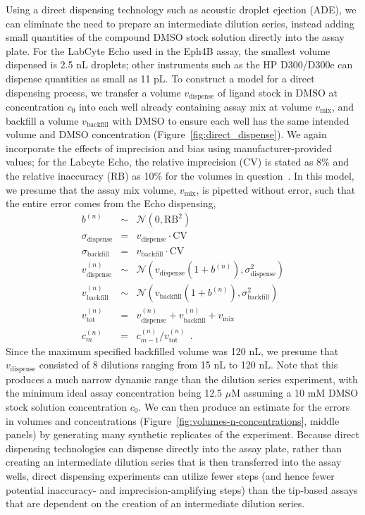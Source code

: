 \documentclass[aps,pre,twocolumn,nofootinbib,superscriptaddress,linenumbers]{revtex4-1}
\begin{document}
Using a direct dispensing technology such as acoustic droplet ejection (ADE), we can eliminate the need to prepare an intermediate dilution series, instead adding small quantities of the compound DMSO stock solution directly into the assay plate.
For the LabCyte Echo used in the Eph4B assay, the smallest volume dispensed is 2.5 nL droplets; other instruments such as the HP D300/D300e can dispense quantities as small as 11 pL.
To construct a model for a direct dispensing process, we transfer a volume $v_\mathrm{dispense}$ of ligand stock in DMSO at concentration $c_0$ into each well already containing assay mix at volume $v_\mathrm{mix}$, and backfill a volume $v_\mathrm{backfill}$ with DMSO to ensure each well has the same intended volume and DMSO concentration (Figure~\ref{fig:direct_dispense}). 
We again incorporate the effects of imprecision and bias using manufacturer-provided values;
for the Labcyte Echo, the relative imprecision (CV) is stated as 8\% and the relative inaccuracy (RB) as 10\% for the volumes in question~\cite{_echo_2011}.
In this model, we presume that the assay mix volume, $v_\mathrm{mix}$, is pipetted without error, such that the entire error comes from the Echo dispensing,
\begin{eqnarray}
b^{(n)} &\sim& \mathcal{N}(0, \mathrm{RB}^2) \nonumber \\
\sigma_\mathrm{dispense} &=& v_\mathrm{dispense} \cdot \mathrm{CV} \nonumber \\
\sigma_\mathrm{backfill} &=& v_\mathrm{backfill} \cdot \mathrm{CV} \nonumber \\
v_\mathrm{dispense}^{(n)} &\sim& \mathcal{N}(v_\mathrm{dispense} (1 + b^{(n)}) , \sigma_\mathrm{dispense}^2) \nonumber \\
v_\mathrm{backfill}^{(n)} &\sim& \mathcal{N}(v_\mathrm{backfill} (1 + b^{(n)}), \sigma_\mathrm{backfill}^2) \nonumber \\
v_\mathrm{tot}^{(n)} &=& v_\mathrm{dispense}^{(n)} + v_\mathrm{backfill}^{(n)} + v_\mathrm{mix} \nonumber \\
c_m^{(n)} &=& c_{m-1}^{(n)} / v_\mathrm{tot}^{(n)} \:\: . \label{equation:stock-concentration-uncertainty-simple}
\end{eqnarray}
Since the maximum specified backfilled volume was 120 nL, we presume that $v_\mathrm{dispense}$ consisted of 8 dilutions ranging from 15 nL to 120 nL. 
Note that this produces a much narrow dynamic range than the dilution series experiment, with the minimum ideal assay concentration being 12.5 $\mu$M assuming a 10 mM DMSO stock solution concentration $c_0$.
We can then produce an estimate for the errors in volumes and concentrations (Figure~\ref{fig:volumes-n-concentrations}, middle panels) by generating many synthetic replicates of the experiment.
Because direct dispensing technologies can dispense directly into the assay plate, rather than creating an intermediate dilution series that is then transferred into the assay wells, direct dispensing experiments can utilize fewer steps (and hence fewer potential inaccuracy- and imprecision-amplifying steps) than the tip-based assays that are dependent on the creation of an intermediate dilution series.
\end{document}
